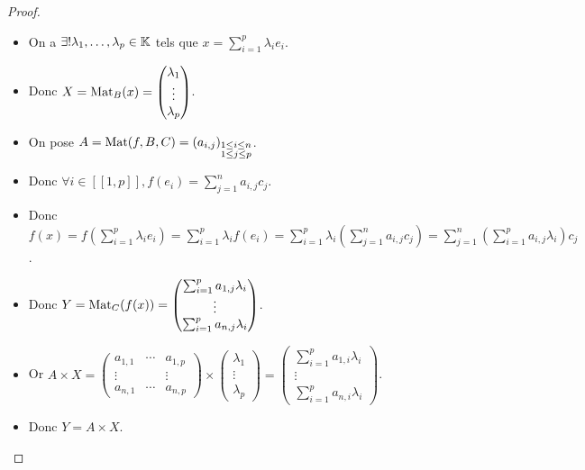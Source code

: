 \documentclass[12pt,a4paper]{report}
\begin{document}
\begin{proof}
    \begin{itemize}
        \item On a $\exists ! \lambda_1, \dots, \lambda_p \in \mathbb{K}$ tels que $x = \sum_{i=1}^p \lambda_i e_i$.
        \item Donc $X = \mathrm{Mat}_B(x) = \left(\begin{matrix} \lambda_1 \\ \vdots \\ \lambda_p \end{matrix}\right)$.
        \item On pose $A = \mathrm{Mat}(f,B,C) = (a_{i,j})_{\substack{1 \le i \le n \\ 1 \le j \le p}}$.
        \item Donc $\forall i \in [\![1,p]\!], f(e_i) = \sum_{j=1}^n a_{i,j} c_j$.
        \item Donc $f(x) = f\left(\sum_{i=1}^p \lambda_i e_i\right) = \sum_{i=1}^p \lambda_i f(e_i) = \sum_{i=1}^p \lambda_i \left(\sum_{j=1}^n a_{i,j} c_j\right) = \sum_{j=1}^n \left(\sum_{i=1}^p a_{i,j} \lambda_i\right) c_j$.
        \item Donc $Y = \mathrm{Mat}_C(f(x)) = \left(\begin{matrix} \sum_{i=1}^p a_{1,j} \lambda_i \\ \vdots \\ \sum_{i=1}^p a_{n,j} \lambda_i \end{matrix}\right)$.
        \item Or $A \times X = \left(\begin{matrix} a_{1,1} & \cdots & a_{1,p} \\ \vdots & & \vdots \\ a_{n,1} & \cdots & a_{n,p} \end{matrix}\right) \times \left(\begin{matrix} \lambda_1 \\ \vdots \\ \lambda_p \end{matrix}\right) = \left(\begin{matrix} \sum_{i=1}^p a_{1,i} \lambda_i \\ \vdots \\ \sum_{i=1}^p a_{n,i} \lambda_i \end{matrix}\right)$.
        \item Donc $Y = A \times X$.
    \end{itemize}
\end{proof}
\end{document}
